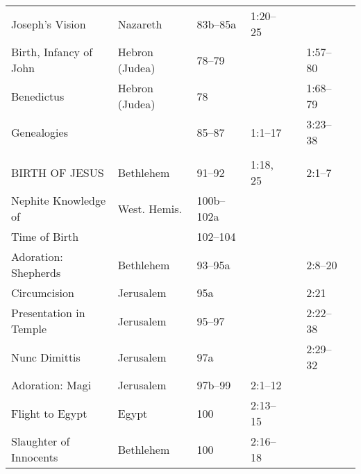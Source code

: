 \begin{longtable}[h]{l@{\hspace{0.5em}}l@{\hspace{0.5em}}l@{\hspace{0.5em}}BBBB}
Joseph's Vision                            & Nazareth            & 83b--85a           & 1:20--25          &                    &                       & \\
Birth, Infancy of John                     & Hebron (Judea)      & 78--79             &                   &                    & 1:57--80              & \\
\quad Benedictus                           & Hebron (Judea)      & 78                 &                   &                    & 1:68--79              & \\
Genealogies                                &                     & 85--87             & 1:1--17           &                    & 3:23--38              & \\
\\
BIRTH OF JESUS                             & Bethlehem           & 91--92             & 1:18, 25          &                    & 2:1--7                & \\
\quad Nephite Knowledge of                 & West. Hemis.        & 100b--102a         &                   &                    &                       & \\
\quad Time of Birth                        &                     & 102--104           &                   &                    &                       & \\
Adoration: Shepherds                       & Bethlehem           & 93--95a            &                   &                    & 2:8--20               & \\
Circumcision                               & Jerusalem           & 95a                &                   &                    & 2:21                  & \\
Presentation in Temple                     & Jerusalem           & 95--97             &                   &                    & 2:22--38              & \\
\quad Nunc Dimittis                        & Jerusalem           & 97a                &                   &                    & 2:29--32              & \\
Adoration: Magi                            & Jerusalem           & 97b--99            & 2:1--12           &                    &                       & \\
Flight to Egypt                            & Egypt               & 100                & 2:13--15          &                    &                       & \\
Slaughter of Innocents                     & Bethlehem           & 100                & 2:16--18          &                    &                       & \\

\end{longtable}
